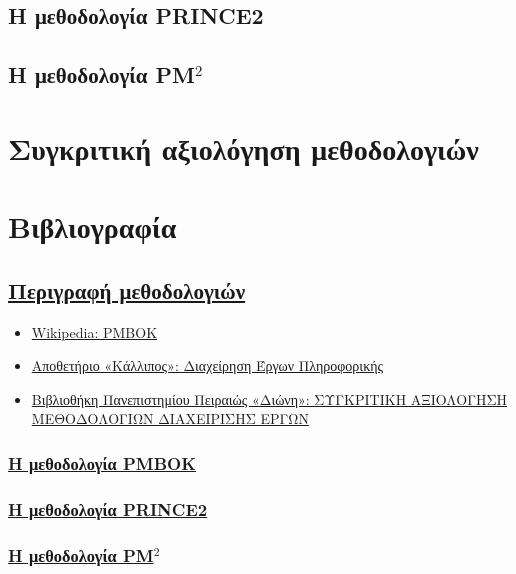 \documentclass[12pt]{turabian-researchpaper}
\begin{document}

\newpage\subsection{Η μεθοδολογία PRINCE2}\label{method_prince2}


\newpage\subsection{Η μεθοδολογία PM\texorpdfstring{$^2$}{}}\label{method_pm2}

\newpage\section{Συγκριτική αξιολόγηση μεθοδολογιών}

\newpage\section{Βιβλιογραφία}
\subsection{\texorpdfstring{\hyperref[methods]{Περιγραφή μεθοδολογιών}}{}}
\begin{itemize}
    \item \href{https://en.wikipedia.org/wiki/Project_Management_Body_of_Knowledge}{Wikipedia: PMBOK}
    \item \href{https://repository.kallipos.gr/bitstream/11419/2262/3/06_kefalaio6.pdf}{Αποθετήριο «Κάλλιπος»: Διαχείρηση Έργων Πληροφορικής}
    \item \href{https://dione.lib.unipi.gr/xmlui/bitstream/handle/unipi/8488/Fragkos_Georgios.pdf}{Βιβλιοθήκη Πανεπιστημίου Πειραιώς «Διώνη»: ΣΥΓΚΡΙΤΙΚΗ ΑΞΙΟΛΟΓΗΣΗ ΜΕΘΟΔΟΛΟΓΙΩΝ ΔΙΑΧΕΙΡΙΣΗΣ ΕΡΓΩΝ}
\end{itemize}
\subsubsection{\texorpdfstring{\hyperref[method_pmbok]{Η μεθοδολογία PMBOK}}{}}
\subsubsection{\texorpdfstring{\hyperref[method_prince2]{Η μεθοδολογία PRINCE2}}{}}
\subsubsection{\texorpdfstring{\hyperref[method_pm2]{Η μεθοδολογία PM$^2$}}{}}
\end{document}
